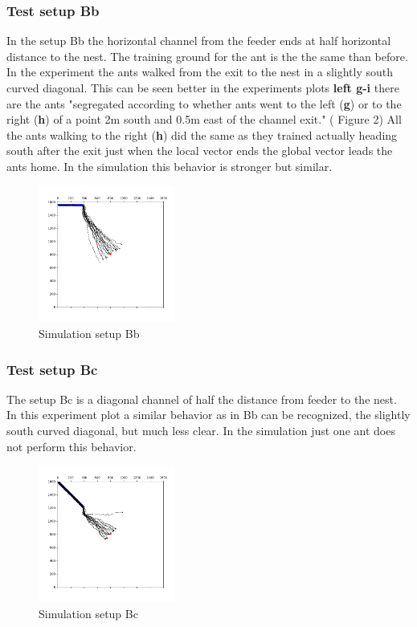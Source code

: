 \documentclass[11pt]{article}
\begin{document}
	\subsubsection{Test setup Bb}
		In the setup Bb the horizontal channel from the feeder ends at half horizontal distance to the nest. The training ground for the ant is the the same than before. \\
In the experiment the ants walked from the exit to the nest in a slightly south curved diagonal. This can be seen better in the experiments plots \textbf{left g-i} there are the ants "segregated according to whether ants went to the left (\textbf{g}) or to the right (\textbf{h}) of a point 2m south and 0.5m east of the channel exit." (\cite{wehner} Figure 2) All the ants walking to the right (\textbf{h}) did the same as they trained actually heading south after the exit just when the local vector ends the global vector leads the ants home. In the simulation this behavior is stronger but similar. 
\begin{figure}
	\includegraphics[width=0.4\textwidth]{test_Bb.png}
	\caption{Simulation setup Bb}
	\label{fig:Bb}
\end{figure}
		\subsubsection{Test setup Bc}
The setup Bc is a diagonal channel of half the distance from feeder to the nest. \\
In this experiment plot a similar behavior as in Bb can be recognized, the slightly south curved diagonal, but much less clear. In the simulation just one ant does not perform this behavior. 
\begin{figure}
	\includegraphics[width=0.4\textwidth]{test_Bc.png}
	\caption{Simulation setup Bc}
	\label{fig:Bc}
\end{figure}
\end{document}
